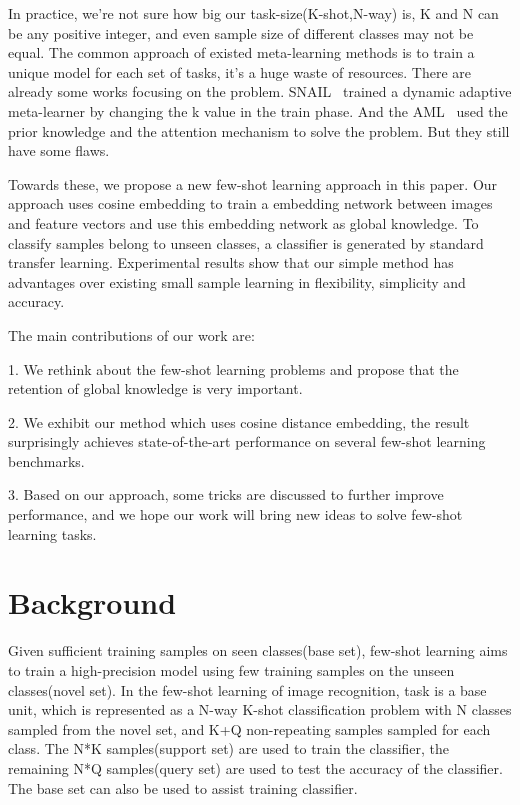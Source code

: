 \documentclass[runningheads]{llncs}
\begin{document}
In practice, we're not sure how big our task-size(K-shot,N-way) is, K and N can be any positive integer, and even sample size of different classes may not be equal. The common approach of existed meta-learning methods is to train a unique model for each set of tasks, it's a huge waste of resources. There are already some works focusing on the problem. SNAIL~\cite{mishra2017simple} trained a dynamic adaptive meta-learner by changing the k value in the train phase. And the AML~\cite{qin2019rethink} used the prior knowledge and the attention mechanism to solve the problem. But they still have some flaws.

Towards these, we propose a new few-shot learning approach in this paper. Our approach uses cosine embedding to train a embedding network between images and feature vectors and use this embedding network as global knowledge. To classify samples belong to unseen classes, a classifier is generated by standard transfer learning. Experimental results show that our simple method has advantages over existing small sample learning in flexibility, simplicity and accuracy.

The main contributions of our work are:

1. We rethink about the few-shot learning problems and propose that the retention of global knowledge is very important.

2. We exhibit our method which uses cosine distance embedding, the result surprisingly achieves state-of-the-art performance on several few-shot learning benchmarks.


3. Based on our approach, some tricks are discussed to further improve performance, and we hope our work will bring new ideas to solve few-shot learning tasks. 

\section{Background}
Given sufficient training samples on seen classes(base set), few-shot learning aims to train a high-precision model using few training samples on the unseen classes(novel set). In the few-shot learning of image recognition, task is a base unit, which is represented as a N-way K-shot classification problem with N classes sampled from the novel set, and K+Q non-repeating samples sampled for each class. The N*K samples(support set) are used to train the classifier, the remaining N*Q samples(query set) are used to test the accuracy of the classifier. The base set can also be used to assist training classifier.
\end{document}
